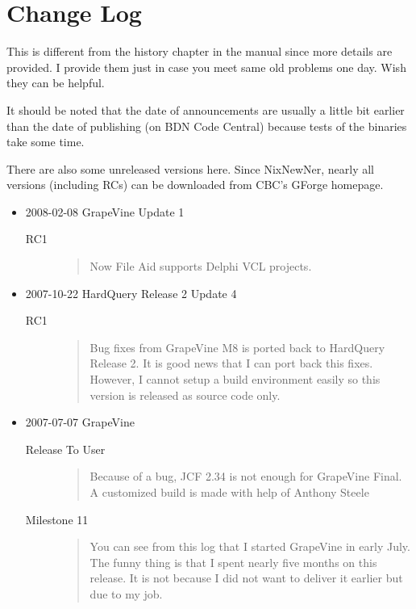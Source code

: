 \chapter{Change Log}
This is different from the history chapter in the manual since more details are
provided. I provide them just in case you meet same old problems one day. Wish
they can be helpful.

It should be noted that the date of announcements are usually a little bit
earlier than the date of publishing (on BDN Code Central) because tests of the
binaries take some time.

There are also some unreleased versions here. Since NixNewNer, nearly all
versions (including RCs) can be downloaded from CBC's GForge homepage.

\begin{itemize}
  \item 2008-02-08 GrapeVine Update 1
\begin{description}
\item[RC1]
\begin{quotation}
Now File Aid supports Delphi VCL projects. 
\end{quotation}
\end{description}
  
  \item 2007-10-22 HardQuery Release 2 Update 4
  \begin{description}
\item[RC1]
\begin{quotation}
Bug fixes from GrapeVine M8 is ported back to HardQuery Release 2. It is good
news that I can port back this fixes. However, I cannot setup a build
environment easily so this version is released as source code only.
\end{quotation}
  \end{description}
	\item 2007-07-07 GrapeVine
	\begin{description}
\item[Release To User]
\begin{quotation}
Because of a bug, JCF 2.34 is not enough for GrapeVine Final. A customized
build is made with help of Anthony Steele
\end{quotation}
\item[Milestone 11]
\begin{quotation}
You can see from this log that I started GrapeVine in early July. The funny
thing is that I spent nearly five months on this release. It is not because I
did not want to deliver it earlier but due to my job.


\end{quotation}
\end{description}
\end{itemize}
